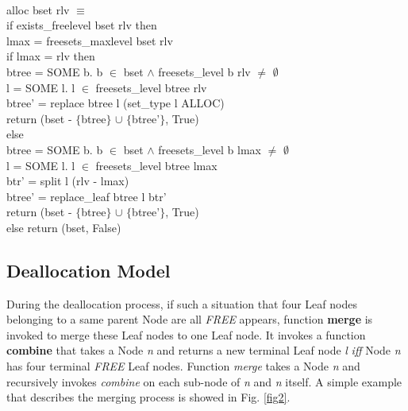 \begin{definition}  \\
	alloc bset rlv $\equiv$ \\
	\phantom{x} \hspace{10pt} if exists\_freelevel bset rlv then \\
	\phantom{x} \hspace{20pt} lmax = freesets\_maxlevel bset rlv \\
	\phantom{x} \hspace{20pt} if lmax = rlv then \\
	\phantom{x} \hspace{30pt} btree = SOME b. b $\in$ bset $\wedge$ freesets\_level b rlv $\ne$ $\emptyset$ \\
	\phantom{x} \hspace{30pt} l = SOME l. l $\in$ freesets\_level btree rlv \\
	\phantom{x} \hspace{30pt} btree' = replace btree l (set\_type l ALLOC) \\
	\phantom{x} \hspace{30pt} return (bset - $\lbrace$btree$\rbrace$ $\cup$ $\lbrace$btree'$\rbrace$, True) \\
	\phantom{x} \hspace{20pt} else \\
	\phantom{x} \hspace{30pt} btree = SOME b. b $\in$ bset $\wedge$ freesets\_level b lmax $\ne$ $\emptyset$ \\
	\phantom{x} \hspace{30pt} l = SOME l. l $\in$ freesets\_level btree lmax \\
	\phantom{x} \hspace{30pt} btr' = split l (rlv - lmax) \\
	\phantom{x} \hspace{30pt} btree' = replace\_leaf btree l btr' \\
	\phantom{x} \hspace{30pt} return (bset - $\lbrace$btree$\rbrace$ $\cup$ $\lbrace$btree'$\rbrace$, True) \\
	\phantom{x} \hspace{10pt} else return (bset, False)
\end{definition}

\subsection{Deallocation Model}
During the deallocation process, if such a situation that four Leaf nodes belonging to a same parent Node are all \emph{FREE} appears, function \textbf{merge} is invoked to merge these Leaf nodes to one Leaf node. It invokes a function \textbf{combine} that takes a Node \emph{n} and returns a new terminal Leaf node \emph{l} \emph{iff} Node \emph{n} has four terminal \emph{FREE} Leaf nodes. Function \emph{merge} takes a Node \emph{n} and recursively invokes \emph{combine} on each sub-node of \emph{n} and \emph{n} itself. A simple example that describes the merging process is showed in Fig. \ref{fig2}.

